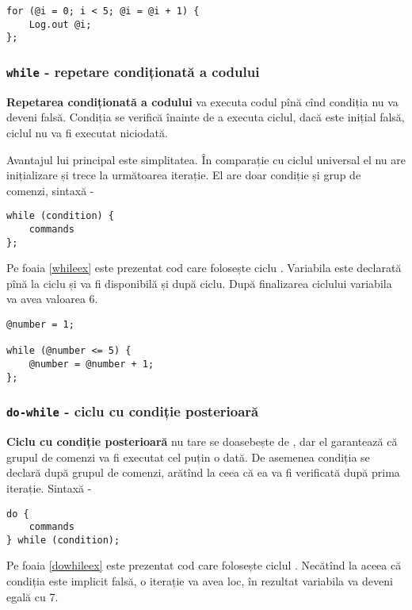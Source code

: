 \begin{lstlisting}[caption=Ciclu universal, label=uniloopex]
for (@i = 0; i < 5; @i = @i + 1) {
	Log.out @i;
};
\end{lstlisting}

\subsubsection{\lstinline`while` - repetare condiționată a codului}

{\bf Repetarea condiționată a codului} va executa codul pînă cînd condiția nu va deveni falsă. Condiția se verifică înainte de a executa ciclul, dacă este inițial falsă, ciclul nu va fi executat niciodată.

Avantajul lui principal este simplitatea. În comparație cu ciclul universal el nu are inițializare și trece la următoarea iterație. El are doar condiție și grup de comenzi, sintaxă -
\begin{lstlisting}[numbers=none]
while (condition) {
	commands
};
\end{lstlisting}

Pe foaia \ref{whileex} este prezentat cod care folosește ciclu . Variabila  este declarată pînă la ciclu și va fi disponibilă și după ciclu. După finalizarea ciclului variabila  va avea valoarea 6.

\begin{lstlisting}[caption=Ciclu while, label=whileex]
@number = 1;

while (@number <= 5) {
	@number = @number + 1;
};
\end{lstlisting}

\subsubsection{\lstinline`do-while` - ciclu cu condiție posterioară}

{\bf Ciclu cu condiție posterioară} nu tare se doasebește de , dar el garantează că grupul de comenzi va fi executat cel puțin o dată. De asemenea condiția se declară după grupul de comenzi, arătînd la ceea că ea va fi verificată după prima iterație. Sintaxă -
\begin{lstlisting}[numbers=none]
do {
	commands
} while (condition);
\end{lstlisting}

Pe foaia \ref{dowhileex} este prezentat cod care folosește ciclul . Necătînd la aceea că condiția este implicit falsă, o iterație va avea loc, în rezultat variabila  va deveni egală cu 7.

